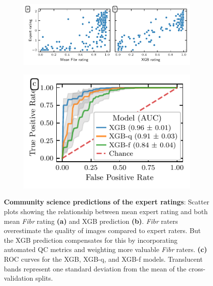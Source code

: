 \documentclass[9pt,lineno]{elife}
\begin{document}
\begin{figure}[tbp]
\begin{fullwidth}
    {\label{fig:fibr-qc:scatter:fibr}}
    {\label{fig:fibr-qc:scatter:xgb}}
    {\label{fig:fibr-qc:roc}}
    \begin{subfigure}{.63\linewidth}
    \centering
    \includegraphics[width=\linewidth]{community-qc/fibr-rating-scatter-plot.pdf}
    \end{subfigure}
    \begin{subfigure}{.37\linewidth}
    \centering
    \includegraphics[width=\linewidth]{community-qc/xgb-roc-curve.pdf}
    \end{subfigure}
    \caption{%
        {\bf Community science predictions of the expert ratings}:
        Scatter plots showing the relationship between mean expert rating and
        both mean \emph{Fibr} rating \textbf{(a)} and XGB prediction
        \textbf{(b)}. \emph{Fibr} raters overestimate the quality of images
        compared to expert raters. But the XGB prediction compensates for this
        by incorporating automated QC metrics and weighting more valuable
        \emph{Fibr} raters.
        \textbf{(c)} ROC curves for the XGB, XGB-q, and XGB-f models.
        Translucent bands represent one standard deviation from the mean
        of the cross-validation splits.
    }
    \label{fig:fibr-qc}
\end{fullwidth}
\end{figure}
\end{document}
